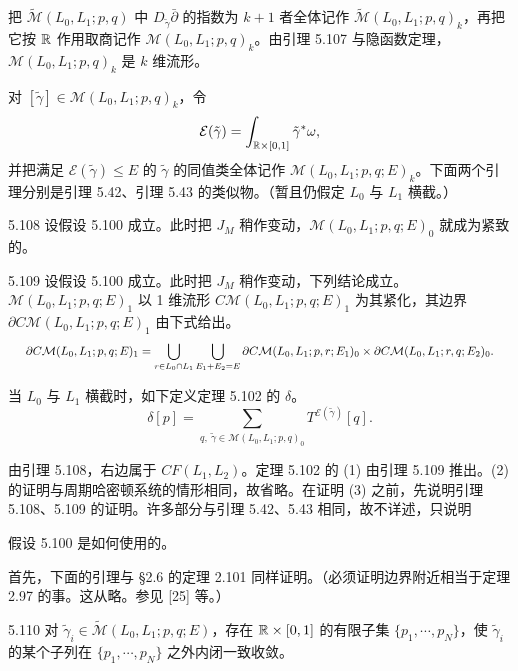 把 $\tilde{\mathcal{M}}(L_0,L_1;p,q)$ 中 $D_{\tilde\gamma}\bar\partial$ 的指数为 $k+1$ 者全体记作 $\tilde{\mathcal{M}}(L_0,L_1;p,q)_k$，再把它按 $\mathbb{R}$ 作用取商记作 $\mathcal{M}(L_0,L_1;p,q)_k$。由引理 5.107 与隐函数定理，$\mathcal{M}(L_0,L_1;p,q)_k$ 是 $k$ 维流形。

对 $[\tilde\gamma]\in\mathcal{M}(L_0,L_1;p,q)_k$，令
\[
\mathcal{E}(\tilde\gamma)=\int_{\mathbb{R}\times[0,1]}\tilde\gamma^*\omega ,
\]
并把满足 $\mathcal{E}(\tilde\gamma)\le E$ 的 $\tilde\gamma$ 的同值类全体记作 $\mathcal{M}(L_0,L_1;p,q;E)_k$。下面两个引理分别是引理 5.42、引理 5.43 的类似物。（暂且仍假定 $L_0$ 与 $L_1$ 横截。）

\begin{lemma}{5.108}
  设假设 5.100 成立。此时把 $J_M$ 稍作变动，$\mathcal{M}(L_0,L_1;p,q;E)_0$ 就成为紧致的。
\end{lemma}

\begin{lemma}{5.109}
  设假设 5.100 成立。此时把 $J_M$ 稍作变动，下列结论成立。$\mathcal{M}(L_0,L_1;p,q;E)_1$ 以 1 维流形 $C\mathcal{M}(L_0,L_1;p,q;E)_1$ 为其紧化，其边界 $\partial C\mathcal{M}(L_0,L_1;p,q;E)_1$ 由下式给出。
\[
  \resizebox{0.97\linewidth}{!}{$\displaystyle \partial C\mathcal{M}(L_0,L_1;p,q;E)_1 =\bigcup_{r\in L_0\cap L_1}\bigcup_{E_1+E_2=E} \partial C\mathcal{M}(L_0,L_1;p,r;E_1)_0\times\partial C\mathcal{M}(L_0,L_1;r,q;E_2)_0 . $}
\]
\end{lemma}

当 $L_0$ 与 $L_1$ 横截时，如下定义定理 5.102 的 $\delta$。
\begin{equation}
  \delta[p]=\sum_{q,\ \tilde\gamma\in\mathcal{M}(L_0,L_1;p,q)_0}T^{\mathcal{E}(\tilde\gamma)}[q]. \tag{5.26}
\end{equation}

由引理 5.108，右边属于 $CF(L_1,L_2)$。定理 5.102 的 (1) 由引理 5.109 推出。(2) 的证明与周期哈密顿系统的情形相同，故省略。在证明 (3) 之前，先说明引理 5.108、5.109 的证明。许多部分与引理 5.42、5.43 相同，故不详述，只说明

假设 5.100 是如何使用的。

首先，下面的引理与 §2.6 的定理 2.101 同样证明。（必须证明边界附近相当于定理 2.97 的事。这从略。参见 [25] 等。）

\begin{lemma}{5.110}
  对 $\tilde\gamma_i\in\tilde{\mathcal{M}}(L_0,L_1;p,q;E)$，存在 $\mathbb{R}\times[0,1]$ 的有限子集 $\{p_1,\cdots,p_N\}$，使 $\tilde\gamma_i$ 的某个子列在 $\{p_1,\cdots,p_N\}$ 之外内闭一致收敛。
\end{lemma}

